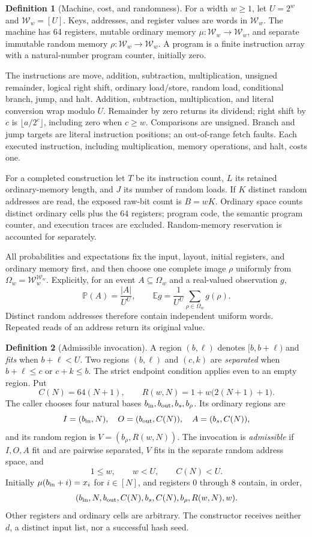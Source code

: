 \documentclass[11pt,a4paper]{article}
\theoremstyle{definition}
\newtheorem{definition}{Definition}
\newcommand{\E}{\mathbb E}
\newcommand{\Prb}{\mathbb P}
\newcommand{\W}{\mathcal W_w}
\begin{document}
\begin{definition}[Machine, cost, and randomness]\label{def:machine}
For a width $w\ge1$, let $U=2^w$ and $\W=[U]$. Keys, addresses, and register
values are words in $\W$. The machine has 64 registers, mutable ordinary
memory $\mu:\W\to\W$, and separate immutable random memory
$\rho:\W\to\W$. A program is a finite instruction array with a
natural-number program counter, initially zero.

The instructions are move, addition, subtraction, multiplication, unsigned
remainder, logical right shift, ordinary load/store, random load,
conditional branch, jump, and halt. Addition, subtraction, multiplication,
and literal conversion wrap modulo $U$. Remainder by zero returns its
dividend; right shift by $c$ is $\lfloor a/2^c\rfloor$, including zero when
$c\ge w$. Comparisons are unsigned. Branch and jump targets are literal
instruction positions; an out-of-range fetch faults. Each executed
instruction, including multiplication, memory operations, and halt, costs one.

For a completed construction let $T$ be its instruction count, $L$ its
retained ordinary-memory length, and $J$ its number of random loads.
If $K$ distinct random addresses are read, the exposed raw-bit count is
$B=wK$. Ordinary space counts distinct ordinary cells plus the 64 registers;
program code, the semantic program counter, and execution traces are excluded.
Random-memory reservation is accounted for separately.

All probabilities and expectations fix the input, layout, initial registers,
and ordinary memory first, and then choose one complete image $\rho$ uniformly
from $\Omega_w=\W^{\W}$. Explicitly, for an event $A\subseteq\Omega_w$
and a real-valued observation $g$,
\[
 \Prb(A)=\frac{|A|}{U^U},\qquad
 \E g=\frac{1}{U^U}\sum_{\rho\in\Omega_w}g(\rho).
\]
Distinct random addresses therefore contain independent uniform words.
Repeated reads of an address return its original value.
\end{definition}

\begin{definition}[Admissible invocation]\label{def:input}
A region $(b,\ell)$ denotes $[b,b+\ell)$ and \emph{fits} when
$b+\ell<U$. Two regions $(b,\ell)$ and $(c,k)$ are \emph{separated} when
$b+\ell\le c$ or $c+k\le b$. The strict endpoint condition applies even
to an empty region. Put
\[
 C(N)=64(N+1),\qquad R(w,N)=1+w\bigl(2(N+1)+1\bigr).
\]
The caller chooses four natural bases $b_{\rm in},b_{\rm out},b_s,b_\rho$.
Its ordinary regions are
\[
 I=(b_{\rm in},N),\quad O=(b_{\rm out},C(N)),\quad A=(b_s,C(N)),
\]
and its random region is $V=(b_\rho,R(w,N))$. The invocation is
\emph{admissible} if $I,O,A$ fit and are pairwise separated, $V$ fits in
the separate random address space, and
\[
 1\le w,\qquad w<U,\qquad C(N)<U.
\]
Initially $\mu(b_{\rm in}+i)=x_i$ for $i\in[N]$, and registers 0 through
8 contain, in order,
\[
 (b_{\rm in},N,b_{\rm out},C(N),b_s,C(N),b_\rho,R(w,N),w).
\]
Other registers and ordinary cells are arbitrary. The constructor receives
neither $d$, a distinct input list, nor a successful hash seed.
\end{definition}
\end{document}
